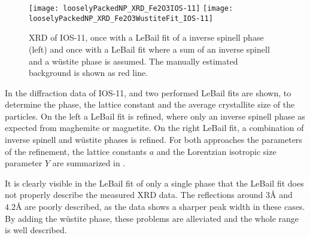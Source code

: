 \documentclass[\main/dresen_thesis.tex]{subfiles}
\begin{document}
  \label{sec:looselyPackedNS:nanoparticle:xrd}
  \begin{figure}[tb]
    \centering
    \texttt{[image: looselyPackedNP\_XRD\_Fe2O3IOS-11]}
    \texttt{[image: looselyPackedNP\_XRD\_Fe2O3WustiteFit\_IOS-11]}
    \caption{\label{fig:looselyPackedNP:nanoparticle:xrd}XRD of IOS-11, once with a LeBail fit of a inverse spinell phase (left) and once with a LeBail fit where a sum of an inverse spinell and a w\"ustite phase is assumed. The manually estimated background is shown as red line.}
  \end{figure}

  In  the diffraction data of IOS-11, and two performed LeBail fits are shown, to determine the phase, the lattice constant and the average crystallite size of the particles.
  On the left a LeBail fit is refined, where only an inverse spinell phase as expected from maghemite or magnetite.
  On the right LeBail fit, a combination of inverse spinell and w\"ustite phases is refined.
  For both approaches the parameters of the refinement, the lattice constants $a$ and the Lorentzian isotropic size parameter $Y$ are summarized in .

  It is clearly visible in the LeBail fit of only a single phase that the LeBail fit does not properly describe the measured XRD data.
  The reflections around $3 \unit{\angstrom}$ and $4.2 \unit{\angstrom}$ are poorly described, as the data shows a sharper peak width in these cases.
  By adding the w\"ustite phase, these problems are alleviated and the whole range is well described.
\end{document}
